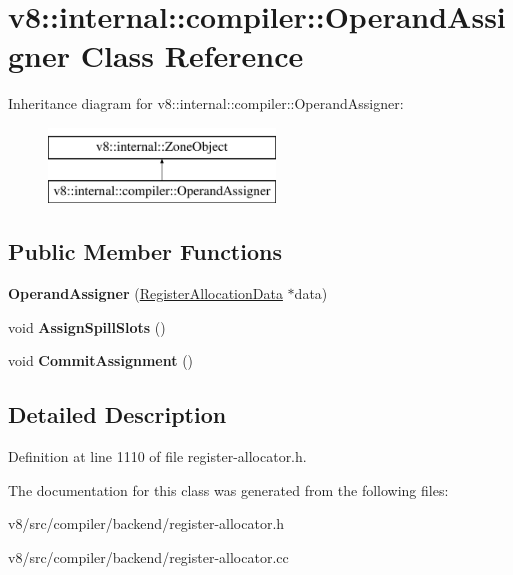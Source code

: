 \hypertarget{classv8_1_1internal_1_1compiler_1_1OperandAssigner}{}\section{v8\+:\+:internal\+:\+:compiler\+:\+:Operand\+Assigner Class Reference}
\label{classv8_1_1internal_1_1compiler_1_1OperandAssigner}
Inheritance diagram for v8\+:\+:internal\+:\+:compiler\+:\+:Operand\+Assigner\+:\begin{figure}[H]
\begin{center}
\leavevmode
\includegraphics[height=2.000000cm]{classv8_1_1internal_1_1compiler_1_1OperandAssigner}
\end{center}
\end{figure}
\subsection*{Public Member Functions}
\begin{DoxyCompactItemize}
\item 
\mbox{\label{classv8_1_1internal_1_1compiler_1_1OperandAssigner_a7ca2c1a36fcbdc35dcca5d1ef1e4a382}} 
{\bfseries Operand\+Assigner} (\mbox{\hyperlink{classv8_1_1internal_1_1compiler_1_1RegisterAllocationData}{Register\+Allocation\+Data}} $\ast$data)
\item 
\mbox{\label{classv8_1_1internal_1_1compiler_1_1OperandAssigner_ad6584f898499c7916d684cb5b7752b4b}} 
void {\bfseries Assign\+Spill\+Slots} ()
\item 
\mbox{\label{classv8_1_1internal_1_1compiler_1_1OperandAssigner_a52c0f0a8cb23f3e0de4b701af4d4b8f0}} 
void {\bfseries Commit\+Assignment} ()
\end{DoxyCompactItemize}


\subsection{Detailed Description}


Definition at line 1110 of file register-\/allocator.\+h.



The documentation for this class was generated from the following files\+:\begin{DoxyCompactItemize}
\item 
v8/src/compiler/backend/register-\/allocator.\+h\item 
v8/src/compiler/backend/register-\/allocator.\+cc\end{DoxyCompactItemize}
